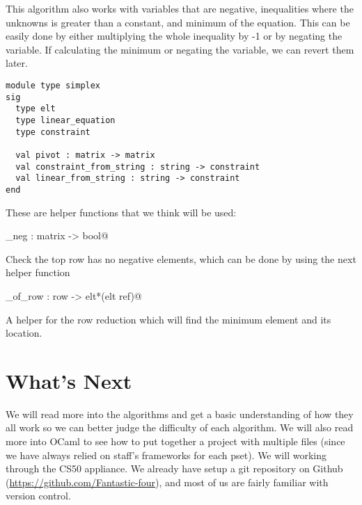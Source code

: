 \documentclass[letterpaper,11pt]{article}
\begin{document}
This algorithm also works with variables that are negative, inequalities where
the unknowns is greater than a constant, and minimum of the equation. This can
be easily done by either multiplying the whole inequality by -1 or by negating
the variable. If calculating the minimum or negating the variable, we can revert
them later.  

\begin{verbatim}
module type simplex
sig
  type elt
  type linear_equation
  type constraint

  val pivot : matrix -> matrix
  val constraint_from_string : string -> constraint
  val linear_from_string : string -> constraint
end
\end{verbatim}

These are helper functions that we think will be used:

\verb@no_neg : matrix -> bool@ 

Check the top row has no negative elements, which can be done by using the next
helper function

\verb@min_of_row : row -> elt*(elt ref)@

A helper for the row reduction which will find the minimum element and its
location.

\section{What's Next}

We will read more into the algorithms and get a basic understanding of how they
all work so we can better judge the difficulty of each algorithm. We will also
read more into OCaml to see how to put together a project with multiple files
(since we have always relied on staff’s frameworks for each pset). We will
working through the CS50 appliance. We already have setup a git repository on
Github (\url{https://github.com/Fantastic-four}), and most of us are fairly
familiar with version control. 
\end{document}
